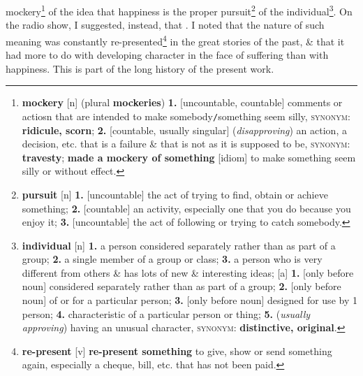 \documentclass[oneside]{book}
\numberwithin{equation}{section}
\begin{document}
mockery\footnote{\textbf{mockery} [n] (plural \textbf{mockeries}) \textbf{1.} [uncountable, countable] comments or actiosn that are intended to make somebody\texttt{/}something seem silly, \textsc{synonym}: \textbf{ridicule, scorn}; \textbf{2.} [countable, usually singular] (\textit{disapproving}) an action, a decision, etc. that is a failure \& that is not as it is supposed to be, \textsc{synonym}: \textbf{travesty}; \textbf{made a mockery of something} [idiom] to make something seem silly or without effect.} of the idea that happiness is the proper pursuit\footnote{\textbf{pursuit} [n] \textbf{1.} [uncountable] the act of trying to find, obtain or achieve something; \textbf{2.} [countable] an activity, especially one that you do because you enjoy it; \textbf{3.} [uncountable] the act of following or trying to catch somebody.} of the individual\footnote{\textbf{individual} [n] \textbf{1.} a person considered separately rather than as part of a group; \textbf{2.} a single member of a group or class; \textbf{3.} a person who is very different from others \& has lots of new \& interesting ideas; [a] \textbf{1.} [only before noun] considered separately rather than as part of a group; \textbf{2.} [only before noun] of or for a particular person; \textbf{3.} [only before noun] designed for use by 1 person; \textbf{4.} characteristic of a particular person or thing; \textbf{5.} (\textit{usually approving}) having an unusual character, \textsc{synonym}: \textbf{distinctive, original}.}. On the radio show, I suggested, instead, that . I noted that the nature of such meaning was constantly re-presented\footnote{\textbf{re-present} [v] \textbf{re-present something} to give, show or send something again, especially a cheque, bill, etc. that has not been paid.} in the great stories of the past, \& that it had more to do with developing character in the face of suffering than with happiness. This is part of the long history of the present work.
\end{document}
